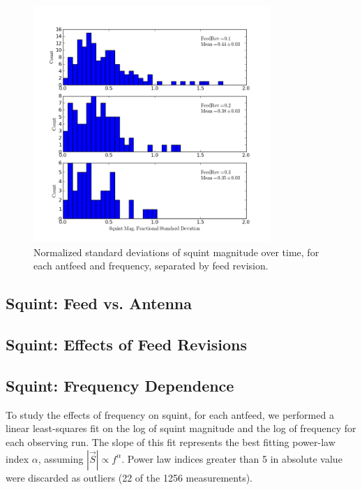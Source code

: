 \documentclass[preprint]{aastex}
\begin{document}
\begin{figure}[htb]
\begin{center}
\includegraphics[width=0.8\textwidth]{images/squinttime_rev}
\caption{Normalized standard deviations of squint magnitude over time, for each antfeed and frequency, separated by feed revision. \label{fig.squint_time}}
\end{center}
\end{figure}

\subsection{Squint: Feed vs. Antenna}\label{ss.antfeed}

\subsection{Squint: Effects of Feed Revisions}\label{ss.revisions}

\subsection{Squint: Frequency Dependence}\label{ss.freq}
To study the effects of frequency on squint, for each antfeed, we
performed a linear least-squares fit on the log of squint magnitude
and the log of frequency for each observing run.  The slope of this
fit represents the best fitting power-law index $\alpha$, assuming
$|\vec{S}| \propto f^\alpha$.  Power law indices greater than 5 in absolute 
value were discarded as outliers (22 of the 1256 measurements).
\end{document}
